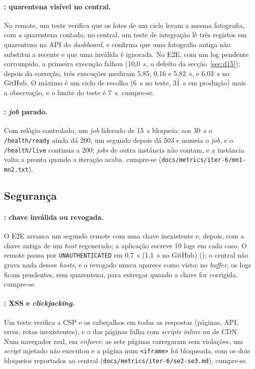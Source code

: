 \paragraph{: quarentena visível no central.}
No remote, um teste verifica que os lotes de um ciclo levam a mesma fotografia, com a quarentena contada; no
central, um teste de integração lê três registos em quarentena na API do \emph{dashboard}, e confirma que uma
fotografia antiga não substitui a recente e que uma inválida é ignorada. No E2E, com um log pendente corrompido, a
primeira execução falhou (10,0~s, o defeito da secção~\ref{sec:d15}); depois da correção, três execuções mediram
5,85, 0,16 e 5,82~s, e 6,03~s no GitHub. O máximo é um ciclo de recolha (6~s no teste, 31~s em produção) mais a
observação, e o limite do teste é 7~s.
 cumpre-se.

\paragraph{: \emph{job} parado.}
Com relógio controlado, um \emph{job} liderado de 15~s bloqueia: aos 30~s o \texttt{/health/ready} ainda dá 200, um
segundo depois dá 503 e nomeia o \emph{job}, e o \texttt{/health/live} continua a 200; \emph{jobs} de outra instância
não contam, e a instância volta a pronta quando a iteração acaba.  cumpre-se
(\texttt{docs/metrics/iter-6/mn1-mn2.txt}).

\subsection{Segurança}
\label{sec:aval-se}

\paragraph{: chave inválida ou revogada.}
O E2E arranca um segundo remote com uma chave inexistente e, depois, com a chave antiga de um \emph{host}
regenerado; a aplicação escreve 10 logs em cada caso. O remote pausa por \texttt{UNAUTHENTICATED} em 0,7~s (1,1~s no GitHub)
(); o central não grava nada desses \emph{hosts}, e o revogado nunca aparece como visto; no \emph{buffer},
os logs ficam pendentes, sem quarentena, para entregar quando a chave for corrigida.  cumpre-se.

\paragraph{: XSS e \emph{clickjacking}.}
Um teste verifica a CSP e os cabeçalhos em todas as respostas (páginas, API, erros, rotas inexistentes), e o das
páginas falha com \emph{scripts inline} ou de CDN. Num navegador real, em \emph{enforce}: as sete páginas carregaram
sem violações, um \emph{script} injetado não executou e a página num \texttt{<iframe>} foi bloqueada, com os dois
bloqueios reportados ao central (\texttt{docs/metrics/iter-6/se2-se3.md}).  cumpre-se.

